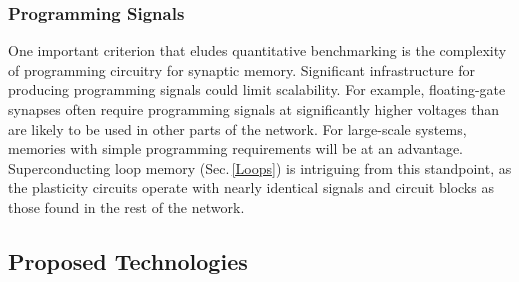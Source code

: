 \documentclass[twocolumn]{article}
\begin{document}
\subsubsection{Programming Signals}
One important criterion that eludes quantitative benchmarking is the complexity of programming circuitry for synaptic memory. Significant infrastructure for producing programming signals could limit scalability. For example, floating-gate synapses often require programming signals at significantly higher voltages than are likely to be used in other parts of the network. For large-scale systems, memories with simple programming requirements will be at an advantage. Superconducting loop memory (Sec.\,\ref{Loops}) is intriguing from this standpoint, as the plasticity circuits operate with nearly identical signals and circuit blocks as those found in the rest of the network.

\subsection{Proposed Technologies}\label{Proposed}
\end{document}
